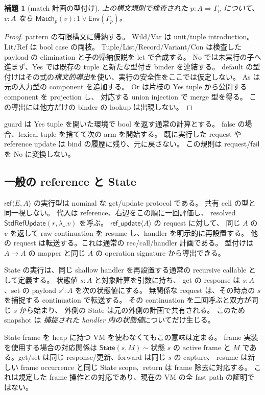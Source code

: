 \documentclass[11pt,a4paper]{article}
\newtheorem{lemma}[definition]{補題}
\newcommand{\Fail}{\mathsf{fail}}
\begin{document}
\begin{lemma}[match 計画の型付け]
上の構文規則で検査された \(p:A\Rightarrow\Gamma_p\) について、
\(v:A\) なら \(\mathsf{Match}_p(v):1\vee\mathsf{Env}(\Gamma_p)\)。
\end{lemma}
\begin{proof}
pattern の有限構文に帰納する。
Wild/Var は unit/tuple introduction。Lit/Ref は bool case の両枝。
Tuple/List/Record/Variant/Con は検査した payload の elimination と子の帰納仮説を let で合成する。
No では未実行の子へ進まず、Yes では既存の tuple と新たな型付き binder を連結する。
default の型付けはその式の\emph{構文的導出}を使い、実行の安全性をここでは仮定しない。
As は元の入力型の component を追加する。
Or は片枝の Yes tuple から公開する component を projection し、
対応する union injection で merge 型を得る。
この導出には他方だけの binder の lookup は出現しない。
\end{proof}

guard は Yes tuple を開いた環境で bool を返す通常の計算とする。
false の場合、lexical tuple を捨てて次の arm を開始する。
既に実行した request や reference update は bind の履歴に残り、元に戻さない。
この規則は request/\(\Fail\) を No に変換しない。

\subsection{一般の reference と State}

\(\mathsf{ref}\langle E,A\rangle\) の実行型は nominal な get/update protocol である。
共有 cell の型と同一視しない。
代入は reference、右辺をこの順に一回評価し、
resolved \(\mathsf{StdRefUpdate}(r,\lambda\_.v)\) を呼ぶ。
\(\mathsf{ref\_update}\langle A\rangle\) の request に対して、
同じ \(A\) の \(v\) を返して raw continuation を resume し、handler を明示的に再設置する。
他の request は転送する。これは通常の rec/call/handler 計画である。
型付けは \(A\to A\) の mapper と同じ \(A\) の operation signature から導出できる。

State の実行は、同じ shallow handler を再設置する通常の recursive callable として定義する。
状態値 \(s:A\) と対象計算を引数に持ち、
get の response は \(s:A\)、set の payload \(s':A\) を次の状態値にする。
無関係な request は、その時点の \(s\) を捕捉する continuation で転送する。
その continuation を二回呼ぶと双方が同じ \(s\) から始まり、
外側の State は元の外側の計画で共有される。
このため snapshot は \emph{捕捉された handler 内の状態値}についてだけ生じる。

State frame を heap に持つ VM を使わなくてもこの意味は定まる。
frame 実装を使用する場合の対応関係は
\(\mathsf{State}(s,M)\sim\text{状態 }s\text{ の active frame と }M\)
である。get/set は同じ response/更新、forward は同じ \(s\) の capture、
resume は新しい frame occurrence と同じ State scope、return は frame 除去に対応する。
これは規定した frame 操作との対応であり、現在の VM の全 fast path の証明ではない。
\end{document}
